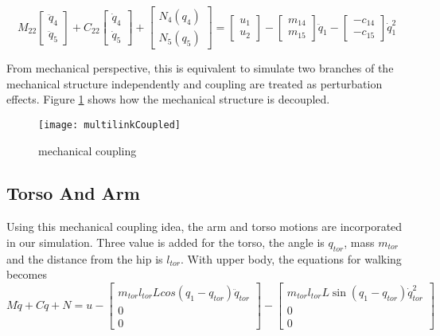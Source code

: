 {\[
M_{22}\left[\begin{array}{c}
\ddot{q}_{4}\\
\ddot{q}_{5}\end{array}\right]+C_{22}\left[\begin{array}{c}
\dot{q}_{4}\\
\dot{q}_{5}\end{array}\right]+\left[\begin{array}{c}
N_{4}(q_{4})\\
N_{5}(q_{5})\end{array}\right]=\left[\begin{array}{c}
u_{1}\\
u_{2}\end{array}\right]-\left[\begin{array}{c}
m_{14}\\
m_{15}\end{array}\right]\ddot{q}_{1}-\left[\begin{array}{c}
-c_{14}\\
-c_{15}\end{array}\right]\dot{q}_{1}^{2}
\]

From mechanical perspective, this is equivalent to simulate two branches of the mechanical structure independently and coupling are treated as perturbation effects.
Figure \ref{fig:mechcouple} shows how the mechanical structure is decoupled.
\begin{figure}[!htbp]
  \begin{center}
      \texttt{[image: multilinkCoupled]}
    \caption{mechanical coupling}
    \label{fig:mechcouple}
\end{center}
\end{figure}








\subsection{Torso And Arm}
Using this mechanical coupling idea, the arm and torso motions are incorporated in our simulation.
Three value is added for the torso, the angle is $q_{tor}$,  mass $m_{tor}$ and the distance from the hip is $l_{tor}$.
With upper body, the equations for walking becomes
\begin{equation}
\label{eq:walkcouplewithtorso}
M\ddot{q}+C\dot{q}+N=u-\left[\begin{array}{c}
m_{tor}l_{tor}Lcos(q_{1}-q_{tor})\ddot{q}_{tor}\\
0\\
0\end{array}\right]-\left[\begin{array}{c}
m_{tor}l_{tor}L\sin(q_{1}-q_{tor})\dot{q}_{tor}^{2}\\
0\\
0\end{array}\right]
\end{equation}

}
